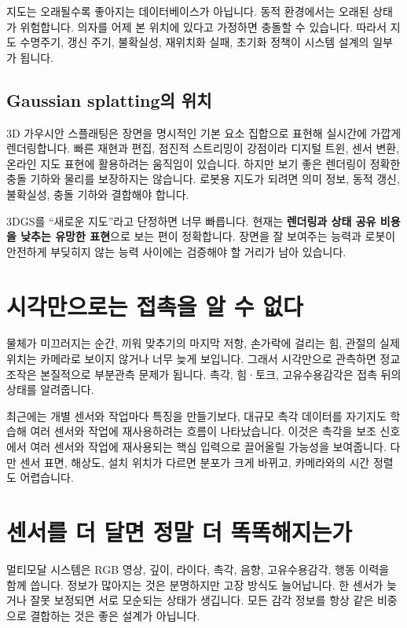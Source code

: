 \documentclass[11pt,openany]{book}
\begin{document}
지도는 오래될수록 좋아지는 데이터베이스가 아닙니다. 동적 환경에서는 오래된 상태가 위험합니다. 의자를 어제 본 위치에 있다고 가정하면 충돌할 수 있습니다. 따라서 지도 수명주기, 갱신 주기, 불확실성, 재위치화 실패, 초기화 정책이 시스템 설계의 일부가 됩니다.

\subsection{Gaussian splatting의 위치}

3D 가우시안 스플래팅은 장면을 명시적인 기본 요소 집합으로 표현해 실시간에 가깝게 렌더링합니다. 빠른 재현과 편집, 점진적 스트리밍이 강점이라 디지털 트윈, 센서 변환, 온라인 지도 표현에 활용하려는 움직임이 있습니다. 하지만 보기 좋은 렌더링이 정확한 충돌 기하와 물리를 보장하지는 않습니다. 로봇용 지도가 되려면 의미 정보, 동적 갱신, 불확실성, 충돌 기하와 결합해야 합니다.

\begin{profbox}
3DGS를 ``새로운 지도''라고 단정하면 너무 빠릅니다. 현재는 \textbf{렌더링과 상태 공유 비용을 낮추는 유망한 표현}으로 보는 편이 정확합니다. 장면을 잘 보여주는 능력과 로봇이 안전하게 부딪히지 않는 능력 사이에는 검증해야 할 거리가 남아 있습니다.
\end{profbox}

\section{시각만으로는 접촉을 알 수 없다}

물체가 미끄러지는 순간, 끼워 맞추기의 마지막 저항, 손가락에 걸리는 힘, 관절의 실제 위치는 카메라로 보이지 않거나 너무 늦게 보입니다. 그래서 시각만으로 관측하면 정교 조작은 본질적으로 부분관측 문제가 됩니다. 촉각, 힘·토크, 고유수용감각은 접촉 뒤의 상태를 알려줍니다.

최근에는 개별 센서와 작업마다 특징을 만들기보다, 대규모 촉각 데이터를 자기지도 학습해 여러 센서와 작업에 재사용하려는 흐름이 나타났습니다. 이것은 촉각을 보조 신호에서 여러 센서와 작업에 재사용되는 핵심 입력으로 끌어올릴 가능성을 보여줍니다. 다만 센서 표면, 해상도, 설치 위치가 다르면 분포가 크게 바뀌고, 카메라와의 시간 정렬도 어렵습니다.

\section{센서를 더 달면 정말 더 똑똑해지는가}

멀티모달 시스템은 RGB 영상, 깊이, 라이다, 촉각, 음향, 고유수용감각, 행동 이력을 함께 씁니다. 정보가 많아지는 것은 분명하지만 고장 방식도 늘어납니다. 한 센서가 늦거나 잘못 보정되면 서로 모순되는 상태가 생깁니다. 모든 감각 정보를 항상 같은 비중으로 결합하는 것은 좋은 설계가 아닙니다.
\end{document}
